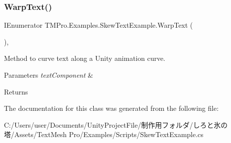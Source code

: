 \subsubsection{\texorpdfstring{Warp\+Text()}{WarpText()}}
{\footnotesize\ttfamily I\+Enumerator T\+M\+Pro.\+Examples.\+Skew\+Text\+Example.\+Warp\+Text (\begin{DoxyParamCaption}{ }\end{DoxyParamCaption})\hspace{0.3cm}{\ttfamily [inline]}, {\ttfamily [private]}}



Method to curve text along a Unity animation curve. 


\begin{DoxyParams}{Parameters}
{\em text\+Component} & \\
\hline
\end{DoxyParams}
\begin{DoxyReturn}{Returns}

\end{DoxyReturn}


The documentation for this class was generated from the following file\+:\begin{DoxyCompactItemize}
\item 
C\+:/\+Users/user/\+Documents/\+Unity\+Project\+File/制作用フォルダ/しろと氷の塔/\+Assets/\+Text\+Mesh Pro/\+Examples/\+Scripts/Skew\+Text\+Example.\+cs\end{DoxyCompactItemize}
